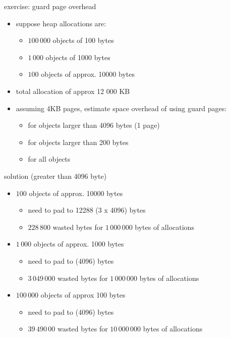 \begin{frame}{exercise: guard page overhead}
    \begin{itemize}
    \item suppose heap allocations are:
        \begin{itemize}
        \item $100\,000$ objects of 100 bytes
        \item $1\,000$ objects of 1000 bytes
        \item $100$ objects of approx. 10000 bytes
        \end{itemize}
    \item total allocation of approx 12 000 KB
    \item assuming 4KB pages, estimate space overhead of using guard pages:
        \begin{itemize}
        \item for objects larger than 4096 bytes (1 page)
        \item for objects larger than 200 bytes
        \item for all objects
        \end{itemize}
    \end{itemize}
\end{frame}

\begin{frame}{solution (greater than 4096 byte)}
    \begin{itemize}
    \item $100$ objects of approx. 10000 bytes
        \begin{itemize}
        \item need to pad to 12288 (3 x 4096) bytes
        \item $228\,800$ wasted bytes for $1\,000\,000$ bytes of allocations
        \end{itemize}
    \item $1\,000$ objects of approx. 1000 bytes
        \begin{itemize}
        \item need to pad to (4096) bytes
        \item $3\,049\,000$ wasted bytes for $1\,000\,000$ bytes of allocations
        \end{itemize}
    \item $100\,000$ objects of approx 100 bytes
        \begin{itemize}
        \item need to pad to (4096) bytes
        \item $39\,490\,00$ wasted bytes for $10\,000\,000$ bytes of allocations
        \end{itemize}
    \end{itemize}
\end{frame}

